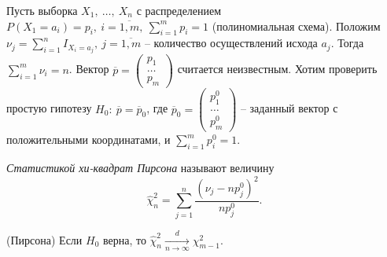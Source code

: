 Пусть выборка $\displaystyle X_{1} ,\ \dotsc ,\ X_{n}$ с распределением $\displaystyle P( X_{1} =a_{i}) =p_{i} ,\ i=\overline{1,m} ,\ \sum _{i=1}^{m} p_{i} =1$ (полиномиальная схема). Положим $\displaystyle \nu _{j} =\sum _{i=1}^{n} I_{X_{i} =a_{j}} ,\ j=\overline{1,m}$ -- количество осуществлений исхода $\displaystyle a_{j}$. Тогда $\displaystyle \sum _{i=1}^{m} \nu _{i} =n$. Вектор $\displaystyle \overline{p} =\begin{pmatrix}
p_{1}\\
\dotsc \\
p_{m}
\end{pmatrix}$ считается неизвестным. Хотим проверить простую гипотезу $\displaystyle H_{0} :\ \overline{p} =\overline{p}_{0}$, где $\displaystyle \overline{p}_{0} =\begin{pmatrix}
p_{1}^{0}\\
\dotsc \\
p_{m}^{0}
\end{pmatrix}$ -- заданный вектор с положительными координатами, и $\displaystyle \sum _{i=1}^{m} p_{i}^{0} =1$.
\begin{definition}
    \textit{Статистикой хи-квадрат Пирсона} называют величину
    \begin{equation*}
        \hat{\chi }_{n}^{2} =\sum _{j=1}^{n}\dfrac{\left( \nu _{j} -np_{j}^{0}\right)^{2}}{np_{j}^{0}} .
    \end{equation*}
\end{definition}
\begin{theorem}
    (Пирсона) Если $\displaystyle H_{0}$ верна, то $\displaystyle \hat{\chi }_{n}^{2}\xrightarrow[n\rightarrow \infty ]{d} \chi _{m-1}^{2}$.
\end{theorem}
